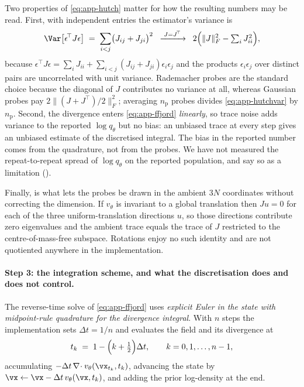 Two properties of \eqref{eq:app-hutch} matter for how the resulting numbers may be
read. First, with independent entries the estimator's variance is
\begin{equation}
  \Var\bigl[\epsilon^{\!\top} J \epsilon\bigr]
  \;=\; \sum_{i<j} \bigl(J_{ij}+J_{ji}\bigr)^{2}
  \;\;\xrightarrow{\;J = J^{\!\top}\;}\;\;
  2\Bigl(\lVert J\rVert_F^{2} - \textstyle\sum_i J_{ii}^{2}\Bigr) ,
  \label{eq:app-hutchvar}
\end{equation}
because $\epsilon^{\!\top} J\epsilon = \sum_i J_{ii} + \sum_{i<j}(J_{ij}+J_{ji})\epsilon_i\epsilon_j$
and the products $\epsilon_i\epsilon_j$ over distinct pairs are uncorrelated with unit
variance. Rademacher probes are the standard choice because the diagonal of $J$
contributes no variance at all, whereas Gaussian probes pay
$2\lVert (J+J^\top)/2\rVert_F^2$;
averaging $n_{\mathrm{p}}$ probes divides \eqref{eq:app-hutchvar} by
$n_{\mathrm{p}}$. Second, the divergence enters \eqref{eq:app-ffjord}
\emph{linearly}, so trace noise adds variance to the reported $\log q_\theta$ but
no bias: an unbiased trace at every step gives an unbiased estimate of the
discretised integral. The bias in the reported number comes from the quadrature,
not from the probes. We have not measured the repeat-to-repeat spread of
$\log q_\theta$ on the reported population, and say so as a limitation
().

Finally,  is what lets the probes be drawn in the ambient $3N$
coordinates without correcting the dimension. If $v_\theta$ is invariant to a
global translation then $J u = 0$ for each of the three uniform-translation
directions $u$, so those directions contribute zero eigenvalues and the ambient
trace equals the trace of $J$ restricted to the centre-of-mass-free subspace.
Rotations enjoy no such identity and are not quotiented anywhere in the
implementation.

\paragraph{Step 3: the integration scheme, and what the discretisation does and does not
control.} The reverse-time solve of \eqref{eq:app-ffjord} uses \emph{explicit Euler
in the state with midpoint-rule quadrature for the divergence integral}. With $n$
steps the implementation sets $\Delta t = 1/n$ and evaluates the field and its
divergence at
\begin{equation}
  t_k \;=\; 1 - \Bigl(k + \tfrac{1}{2}\Bigr)\Delta t ,
  \qquad k = 0,1,\dots,n-1 ,
  \label{eq:app-grid}
\end{equation}
accumulating $-\Delta t\,\nabla\!\cdot v_\theta(\vx_{t_k},t_k)$, advancing the state
by $\vx \leftarrow \vx - \Delta t\, v_\theta(\vx,t_k)$, and adding the prior
log-density at the end.

